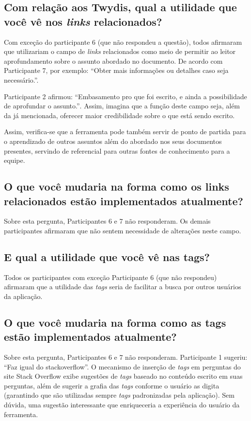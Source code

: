 \subsection{Com relação aos Twydis, qual a utilidade que você vê nos \textit{links} relacionados?}

Com exceção do participante 6 (que não respondeu a questão), todos afirmaram que utilizariam o campo de \textit{links} relacionados como meio de permitir ao leitor aprofundamento sobre o assunto abordado no documento. De acordo com Participante 7, por exemplo: ``Obter mais informações ou detalhes caso seja necessário.''.

Participante 2 afirmou: ``Embasamento pro que foi escrito, e ainda a possibilidade de aprofundar o assunto.''. Assim, imagina que a função deste campo seja, além da já mencionada, oferecer maior credibilidade sobre o que está sendo escrito.

Assim, verifica-se que a ferramenta pode também servir de ponto de partida para o aprendizado de outros assuntos além do abordado nos seus documentos presentes, servindo de referencial para outras fontes de conhecimento para a equipe.

\subsection{O que você mudaria na forma como os links relacionados estão implementados atualmente?}

Sobre esta pergunta, Participantes 6 e 7 não responderam. Os demais participantes afirmaram que não sentem necessidade de alterações neste campo.

\subsection{E qual a utilidade que você vê nas tags?}

Todos os participantes com exceção Participante 6 (que não respondeu) afirmaram que a utilidade das \textit{tags} seria de facilitar a busca por outros usuários da aplicação.

\subsection{O que você mudaria na forma como as tags estão implementados atualmente?}

Sobre esta pergunta, Participantes 6 e 7 não responderam. Participante 1 sugeriu: ``Faz igual do stackoverflow''. O mecanismo de inserção de \textit{tags} em perguntas do site Stack Overflow exibe sugestões de \textit{tags} baseado no conteúdo escrito em suas perguntas, além de sugerir a grafia das \textit{tags} conforme o usuário as digita (garantindo que são utilizadas sempre \textit{tags} padronizadas pela aplicação). Sem dúvida, uma sugestão interessante que enriqueceria a experiência do usuário da ferramenta.

